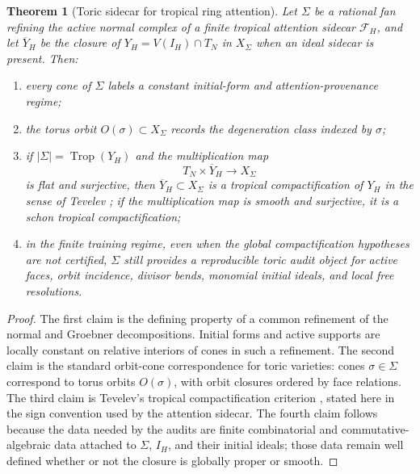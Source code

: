\documentclass[11pt]{article}
\theoremstyle{definition}
\theoremstyle{plain}
\newtheorem{theorem}[definition]{Theorem}
\theoremstyle{remark}
\numberwithin{equation}{section}
\newcommand{\abs}[1]{\left\lvert #1\right\rvert}
\begin{document}
\begin{theorem}[Toric sidecar for tropical ring attention]\label{thm:tropical-attention-toric-sidecar}
Let $\Sigma$ be a rational fan refining the active normal complex of a finite tropical attention sidecar $\mathcal F_H$, and let $\overline Y_H$ be the closure of $Y_H=V(I_H)\cap T_N$ in $X_\Sigma$ when an ideal sidecar is present.  Then:
\begin{enumerate}[leftmargin=2em]
  \item every cone of $\Sigma$ labels a constant initial-form and attention-provenance regime;
  \item the torus orbit $O(\sigma)\subset X_\Sigma$ records the degeneration class indexed by $\sigma$;
  \item if $\abs{\Sigma}=\operatorname{Trop}(Y_H)$ and the multiplication map
  \begin{equation}
    T_N\times \overline Y_H\longrightarrow X_\Sigma
  \end{equation}
  is flat and surjective, then $\overline Y_H\subset X_\Sigma$ is a tropical compactification of $Y_H$ in the sense of Tevelev \cite{tevelev2007compactifications}; if the multiplication map is smooth and surjective, it is a schon tropical compactification;
  \item in the finite training regime, even when the global compactification hypotheses are not certified, $\Sigma$ still provides a reproducible toric audit object for active faces, orbit incidence, divisor bends, monomial initial ideals, and local free resolutions.
\end{enumerate}
\end{theorem}

\begin{proof}
The first claim is the defining property of a common refinement of the normal and Groebner decompositions.  Initial forms and active supports are locally constant on relative interiors of cones in such a refinement.  The second claim is the standard orbit-cone correspondence for toric varieties: cones $\sigma\in\Sigma$ correspond to torus orbits $O(\sigma)$, with orbit closures ordered by face relations.  The third claim is Tevelev's tropical compactification criterion \cite{tevelev2007compactifications}, stated here in the sign convention used by the attention sidecar.  The fourth claim follows because the data needed by the audits are finite combinatorial and commutative-algebraic data attached to $\Sigma$, $I_H$, and their initial ideals; those data remain well defined whether or not the closure is globally proper or smooth.
\end{proof}
\end{document}
